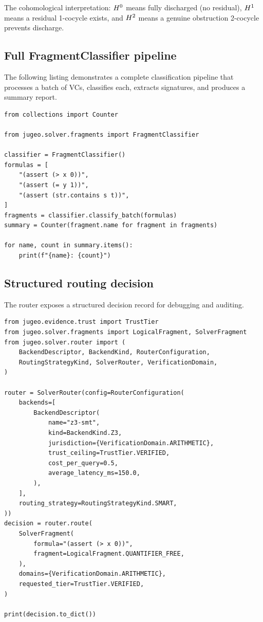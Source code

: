 \documentclass[11pt]{article}
\begin{document}
The cohomological interpretation: $H^{0}$ means fully
discharged (no residual), $H^{1}$ means a residual 1-cocycle
exists, and $H^{2}$ means a genuine obstruction 2-cocycle
prevents discharge.

\subsection{Full FragmentClassifier pipeline}\label{sec:api-pipeline}

The following listing demonstrates a complete classification
pipeline that processes a batch of VCs, classifies each,
extracts signatures, and produces a summary report.

\begin{lstlisting}[caption={Full FragmentClassifier pipeline.},
                   label=lst:full-pipeline]
from collections import Counter

from jugeo.solver.fragments import FragmentClassifier

classifier = FragmentClassifier()
formulas = [
    "(assert (> x 0))",
    "(assert (= y 1))",
    "(assert (str.contains s t))",
]
fragments = classifier.classify_batch(formulas)
summary = Counter(fragment.name for fragment in fragments)

for name, count in summary.items():
    print(f"{name}: {count}")
\end{lstlisting}

\subsection{Structured routing decision}\label{sec:api-trace}

The router exposes a structured decision record for debugging and auditing.

\begin{lstlisting}[caption={Inspecting a routing decision.},
                   label=lst:decision-trace]
from jugeo.evidence.trust import TrustTier
from jugeo.solver.fragments import LogicalFragment, SolverFragment
from jugeo.solver.router import (
    BackendDescriptor, BackendKind, RouterConfiguration,
    RoutingStrategyKind, SolverRouter, VerificationDomain,
)

router = SolverRouter(config=RouterConfiguration(
    backends=[
        BackendDescriptor(
            name="z3-smt",
            kind=BackendKind.Z3,
            jurisdiction={VerificationDomain.ARITHMETIC},
            trust_ceiling=TrustTier.VERIFIED,
            cost_per_query=0.5,
            average_latency_ms=150.0,
        ),
    ],
    routing_strategy=RoutingStrategyKind.SMART,
))
decision = router.route(
    SolverFragment(
        formula="(assert (> x 0))",
        fragment=LogicalFragment.QUANTIFIER_FREE,
    ),
    domains={VerificationDomain.ARITHMETIC},
    requested_tier=TrustTier.VERIFIED,
)

print(decision.to_dict())
\end{lstlisting}
\end{document}
